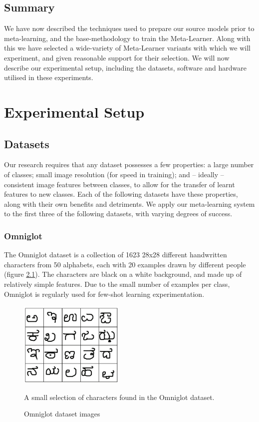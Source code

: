\documentclass{report}
\begin{document}
\section{Summary}
We have now described the techniques used to prepare our source models prior to meta-learning, and the base-methodology to train the Meta-Learner. Along with this we have selected a wide-variety of Meta-Learner variants with which we will experiment, and given reasonable support for their selection. We will now describe our experimental setup, including the datasets, software and hardware utilised in these experiments.


\chapter{Experimental Setup} \label{experimental-setup}
\section{Datasets} \label{datasets}
Our research requires that any dataset possesses a few properties: a large number of classes; small image resolution (for speed in training); and -- ideally -- consistent image features between classes, to allow for the transfer of learnt features to new classes. Each of the following datasets have these properties, along with their own benefits and detriments. We apply our meta-learning system to the first three of the following datasets, with varying degrees of success. \par

\subsection{Omniglot}
The Omniglot\parencite{omniglot} dataset is a collection of 1623 28x28 different handwritten characters from 50 alphabets, each with 20 examples drawn by different people (figure \ref{fig:omniglot:1}). The characters are black on a white background, and made up of relatively simple features. Due to the small number of examples per class, Omniglot is regularly used for few-shot learning experimentation\parencite{mlwtc}\parencite{matching}\parencite{prototypical}.

\begin{figure}[h]
	\centering
	\includegraphics[width=5cm]{omniglot}
	\caption{Omniglot dataset images}
	A small selection of characters found in the Omniglot dataset.
	\label{fig:omniglot:1}
\end{figure}
\end{document}
